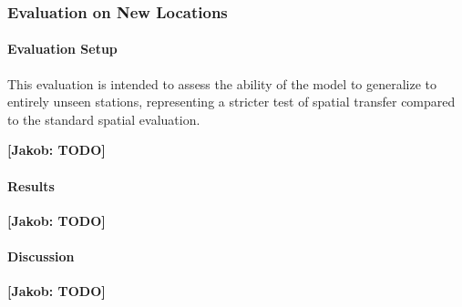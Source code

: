 \subsubsection*{Evaluation on New Locations}

\paragraph{Evaluation Setup}
This evaluation is intended to assess the ability of the model to generalize to entirely unseen stations, representing a stricter test of spatial transfer compared to the standard spatial evaluation.

\textbf{[Jakob: TODO]}

\paragraph{Results}
\textbf{[Jakob: TODO]}

\paragraph{Discussion}
\textbf{[Jakob: TODO]}
